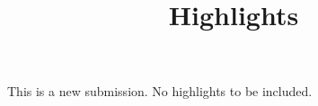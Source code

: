 \documentclass[10pt]{article}
\title{Highlights}
\date{}
\begin{document}
\maketitle

This is a new submission. No highlights to be included.
\end{document}

